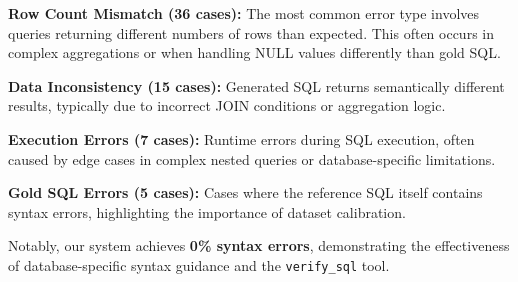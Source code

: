 \textbf{Row Count Mismatch (36 cases):} The most common error type involves queries returning different numbers of rows than expected. This often occurs in complex aggregations or when handling NULL values differently than gold SQL.

\textbf{Data Inconsistency (15 cases):} Generated SQL returns semantically different results, typically due to incorrect JOIN conditions or aggregation logic.

\textbf{Execution Errors (7 cases):} Runtime errors during SQL execution, often caused by edge cases in complex nested queries or database-specific limitations.

\textbf{Gold SQL Errors (5 cases):} Cases where the reference SQL itself contains syntax errors, highlighting the importance of dataset calibration.

Notably, our system achieves \textbf{0\% syntax errors}, demonstrating the effectiveness of database-specific syntax guidance and the \texttt{verify\_sql} tool.
